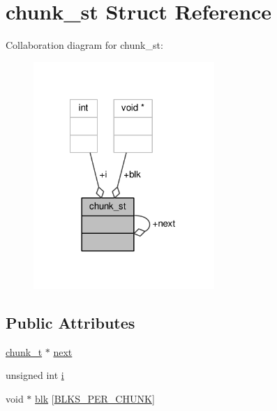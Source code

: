 \hypertarget{structchunk__st}{\section{chunk\-\_\-st Struct Reference}
\label{structchunk__st}
}


Collaboration diagram for chunk\-\_\-st\-:
\nopagebreak
\begin{figure}[H]
\begin{center}
\leavevmode
\includegraphics[width=194pt]{structchunk__st__coll__graph}
\end{center}
\end{figure}
\subsection*{Public Attributes}
\begin{DoxyCompactItemize}
\item 
\hyperlink{gc_8c_a86d0de2b8550a1f7156c949ace00bba1}{chunk\-\_\-t} $\ast$ \hyperlink{structchunk__st_ae5c359b00750ef57e36e5c7ac370074b}{next}
\item 
unsigned int \hyperlink{structchunk__st_a0b638207fcd12ccf21ca190ad2841ef8}{i}
\item 
void $\ast$ \hyperlink{structchunk__st_ae095021656a922df53d27b5489abbab0}{blk} \mbox{[}\hyperlink{gc_8c_a763180cecd4df6e5861984327e46f62e}{B\-L\-K\-S\-\_\-\-P\-E\-R\-\_\-\-C\-H\-U\-N\-K}\mbox{]}
\end{DoxyCompactItemize}


